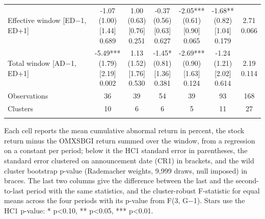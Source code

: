\begin{threeparttable}
\begin{tabular}{@{}lcccccc}
Effective window [ED$-$1, ED+1] & \makecell{-1.07\\(1.00)\\{}[1.44]\\{0.689}} & \makecell{1.00\\(0.63)\\{}[0.76]\\{0.251}} & \makecell{-0.37\\(0.56)\\{}[0.63]\\{0.627}} & \makecell{-2.05***\\(0.61)\\{}[0.90]\\{0.065}} & \makecell{-1.68**\\(0.82)\\{}[1.04]\\{0.179}} & \makecell{2.71\\{0.066}} \\
\addlinespace[0.25ex]
\addlinespace[0.25ex]
Total window [AD$-$1, ED+1] & \makecell{-5.49***\\(1.79)\\{}[2.19]\\{0.002}} & \makecell{1.13\\(1.52)\\{}[1.76]\\{0.530}} & \makecell{-1.45*\\(0.81)\\{}[1.36]\\{0.381}} & \makecell{-2.69***\\(0.90)\\{}[1.63]\\{0.124}} & \makecell{-1.24\\(1.21)\\{}[2.02]\\{0.614}} & \makecell{2.19\\{0.114}} \\
\addlinespace[0.25ex]
\addlinespace[0.25ex]
Observations & 36 & 39 & 54 & 39 & 93 & 168 \\
\addlinespace[0.25ex]
\addlinespace[0.25ex]
Clusters & 10 & 6 & 6 & 5 & 11 & 27 \\
\addlinespace[0.25ex]
\bottomrule
\end{tabular}
\endgroup
\noindent\begin{minipage}{\linewidth}\smallskip\footnotesize
Each cell reports the mean cumulative abnormal return in percent, the stock return minus the OMXSBGI return summed over the window, from a regression on a constant per period; below it the HC1 standard error in parentheses, the standard error clustered on announcement date (CR1) in brackets, and the wild cluster bootstrap p-value (Rademacher weights, 9,999 draws, null imposed) in braces. The last two columns give the difference between the last and the second-to-last period with the same statistics, and the cluster-robust F-statistic for equal means across the four periods with its p-value from F(3, G$-$1). Stars use the HC1 p-value: * p<0.10, ** p<0.05, *** p<0.01.\end{minipage}

\end{threeparttable}